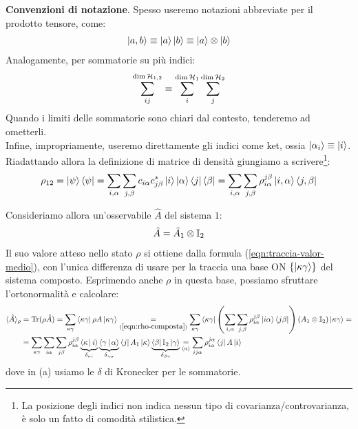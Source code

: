 \documentclass[../../InformazioneQuantistica.tex]{subfiles}
\begin{document}
\textbf{Convenzioni di notazione}. Spesso useremo notazioni abbreviate per il prodotto tensore, come:
\begin{align*}
    \Ket{a,b} \equiv \Ket{a}\Ket{b} \equiv \Ket{a}\otimes \Ket{b}
\end{align*}
Analogamente, per sommatorie su più indici:
\begin{align*}
    \sum_{ij}^{\operatorname{dim}\mathcal{H}_{1,2}} \equiv \sum_{i}^{\operatorname{\dim}\mathcal{H}_1} \sum_{j}^{\operatorname{dim}\mathcal{H}_2}
\end{align*}
Quando i limiti delle sommatorie sono chiari dal contesto, tenderemo ad ometterli.\\
Infine, impropriamente, useremo direttamente gli indici come ket, ossia $\Ket{\alpha_i} \equiv \Ket{i}$.\\

Riadattando allora la definizione di matrice di densità giungiamo a scrivere\footnote{La posizione degli indici non indica nessun tipo di covarianza/controvarianza, è solo un fatto di comodità stilistica.}:
\begin{align}
\rho_{12} = \Ket{\psi}\Bra{\psi} = \sum_{i,\alpha}\sum_{j,\beta}c_{i\alpha}c^*_{j\beta} \Ket{i}\Ket{\alpha}\Bra{j}\Bra{\beta} = \sum_{i,\alpha}\sum_{j,\beta} \rho_{i\alpha}^{j\beta} \Ket{i,\alpha}\Bra{j,\beta}
\label{eqn:rho-composta}
\end{align}

Consideriamo allora un'osservabile $\hat{A}$ del sistema $1$:
\begin{align*}
\hat{A} = \hat{A}_1 \otimes \mathbb{I}_2
\end{align*}
Il suo valore atteso nello stato $\rho$ si ottiene dalla formula (\ref{eqn:traccia-valor-medio}), con l'unica differenza di usare per la traccia una base ON $\{\Ket{\kappa\gamma}\}$ del sistema composto. Esprimendo anche $\rho$ in questa base, possiamo sfruttare l'ortonormalità e calcolare:
\begin{align*}
\langle \hat{A}\rangle_\rho &=
\operatorname{Tr}(\rho \hat{A}) = \sum_{\kappa\gamma}\Bra{\kappa\gamma} \rho A 
\Ket{\kappa\gamma} \underset{(\ref{eqn:rho-composta})}{=} \sum_{\kappa\gamma} \Bra{\kappa\gamma} \left(\sum_{i,\alpha}\sum_{j,\beta}\rho_{i\alpha}^{j\beta}\Ket{i\alpha}\Bra{j\beta}\right)
\left(A_1 \otimes \mathbb{I}_2\right)  \Ket{\kappa\gamma} =\\
&= \sum_{\kappa \gamma} \sum_{i\alpha}\sum_{j\beta} \rho_{i\alpha}^{j\beta} \underbrace{\Braket{\kappa|i}}_{\delta_{\kappa i}}\underbrace{\Braket{\gamma|\alpha}}_{\delta_{\gamma \alpha}}\Bra{j}A_1\Ket{\kappa}\underbrace{\Bra{\beta}\mathbb{I}_2\Ket{\gamma}}_{\delta_{\beta \gamma}} \underset{(a)}{=}\sum_{ij \alpha} \rho_{i\alpha}^{j\alpha}\Bra{j}A\Ket{i} 
\end{align*}
dove in (a) usiamo le $\delta$ di Kronecker per  le sommatorie.\\
\end{document}
